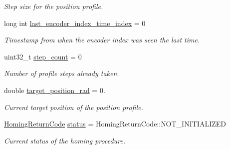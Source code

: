 \begin{DoxyCompactItemize}
\begin{DoxyCompactList}\small\item\em Step size for the position profile. \end{DoxyCompactList}\item 
long int \hyperlink{structblmc__robots_1_1HomingState_a770422e8764a847278e5353e2ebe57a6}{last\+\_\+encoder\+\_\+index\+\_\+time\+\_\+index} = 0\hypertarget{structblmc__robots_1_1HomingState_a770422e8764a847278e5353e2ebe57a6}{}\label{structblmc__robots_1_1HomingState_a770422e8764a847278e5353e2ebe57a6}

\begin{DoxyCompactList}\small\item\em Timestamp from when the encoder index was seen the last time. \end{DoxyCompactList}\item 
uint32\+\_\+t \hyperlink{structblmc__robots_1_1HomingState_a16adc4753efe03def5ef3ebf7abc632c}{step\+\_\+count} = 0\hypertarget{structblmc__robots_1_1HomingState_a16adc4753efe03def5ef3ebf7abc632c}{}\label{structblmc__robots_1_1HomingState_a16adc4753efe03def5ef3ebf7abc632c}

\begin{DoxyCompactList}\small\item\em Number of profile steps already taken. \end{DoxyCompactList}\item 
double \hyperlink{structblmc__robots_1_1HomingState_a72a681755f52b727ddca35e3811fa5f5}{target\+\_\+position\+\_\+rad} = 0.\hypertarget{structblmc__robots_1_1HomingState_a72a681755f52b727ddca35e3811fa5f5}{}\label{structblmc__robots_1_1HomingState_a72a681755f52b727ddca35e3811fa5f5}

\begin{DoxyCompactList}\small\item\em Current target position of the position profile. \end{DoxyCompactList}\item 
\hyperlink{blmc__joint__module_8hpp_aa1075809042ff261e4b0a20d161448b6}{Homing\+Return\+Code} \hyperlink{structblmc__robots_1_1HomingState_af821e232c974385ae24e20a7f75665f7}{status} = Homing\+Return\+Code\+::\+N\+O\+T\+\_\+\+I\+N\+I\+T\+I\+A\+L\+I\+Z\+ED\hypertarget{structblmc__robots_1_1HomingState_af821e232c974385ae24e20a7f75665f7}{}\label{structblmc__robots_1_1HomingState_af821e232c974385ae24e20a7f75665f7}

\begin{DoxyCompactList}\small\item\em Current status of the homing procedure. \end{DoxyCompactList}\end{DoxyCompactItemize}



